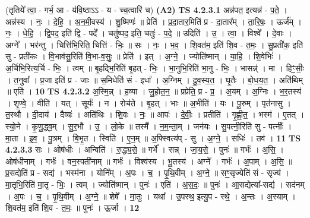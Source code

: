 \documentclass[17pt]{extarticle}
\begin{document}
                      (तृतिये᳚ त्वा॒ - गर्भ॒ आ - य॑वि॒ष्ठाऽऽ - य - च्च॒त्वारि॑ च)  \textbf{(A2)} \newline \newline
                                \textbf{ TS 4.2.3.1} \newline
                  अन्न॑पत॒ इत्यन्न॑ - प॒ते॒ । अन्न॑स्य । नः॒ । दे॒हि॒ । अ॒न॒मी॒वस्य॑ । शु॒ष्मिणः॑ ॥ प्रेति॑ । प्र॒दा॒तार॒मिति॑ प्र - दा॒तार᳚म् । ता॒रि॒षः॒ । ऊर्ज᳚म् । नः॒ । धे॒हि॒ । द्वि॒पद॒ इति॑ द्वि - पदे᳚ । चतु॑ष्पद॒ इति॒ चतुः॑ - प॒दे॒ ॥ उदिति॑ । उ॒ । त्वा॒ । विश्वे᳚ । दे॒वाः । अग्ने᳚ । भर॑न्तु । चित्ति॑भि॒रिति॒ चित्ति॑ - भिः॒ ॥ सः । नः॒ । भ॒व॒ । शि॒वत॑म॒ इति॑ शि॒व - त॒मः॒ । सु॒प्रती॑क॒ इति॑ सु - प्रती॑कः । वि॒भाव॑सु॒रिति॑ वि॒भा-व॒सुः॒ ॥ प्रेति॑ । इत् । अ॒ग्ने॒ । ज्योति॑ष्मान् । या॒हि॒ । शि॒वेभिः॑ । अ॒र्चिभि॒रित्य॒र्चि - भिः॒ । त्वम् ॥ बृ॒हद्भि॒रिति॑ बृ॒हत् - भिः॒ । भा॒नुभि॒रिति॑ भा॒नु - भिः॒ । भासन्न्॑ । मा । हिꣳ॒॒सीः॒ । त॒नुवा᳚ । प्र॒जा इति॑ प्र - जाः ॥ स॒मिधेति॑ सं - इधा᳚ । अ॒ग्निम् । दु॒व॒स्य॒त॒ । घृ॒तैः । बो॒ध॒य॒त॒ । अति॑थिम् ॥ एति॑ । \textbf{  10} \newline
                  \newline
                                \textbf{ TS 4.2.3.2} \newline
                  अ॒स्मि॒न्न् । ह॒व्या । जु॒हो॒त॒न॒ ॥ प्रप्रेति॒ प्र - प्र॒ । अ॒यम् । अ॒ग्निः । भ॒र॒तस्य॑ । शृ॒ण्वे॒ । वीति॑ । यत् । सूर्यः॑ । न । रोच॑ते । बृ॒हत् । भाः ॥ अ॒भीति॑ । यः । पू॒रुम् । पृत॑नासु । त॒स्थौ । दी॒दाय॑ । दैव्यः॑ । अति॑थिः । शि॒वः । नः॒ ॥ आपः॑ । दे॒वीः॒ । प्रतीति॑ । गृ॒ह्णी॒त॒ । भस्म॑ । ए॒तत् । स्यो॒ने । कृ॒णु॒द्ध्व॒म् । सु॒र॒भौ । उ॒ । लो॒के ॥ तस्मै᳚ । न॒म॒न्ता॒म् । जन॑यः । सु॒पत्नी॒रिति॑ सु - पत्नीः᳚ । मा॒ता । इ॒व॒ । पु॒त्रम् । बि॒भृ॒त । स्विति॑ । ए॒न॒म् ॥ अ॒फ्स्वित्य॑प् - सु । अ॒ग्ने॒ । सधिः॑ । तव॑ । \textbf{  11} \newline
                  \newline
                                \textbf{ TS 4.2.3.3} \newline
                  सः । ओष॑धीः । अन्विति॑ । रु॒द्ध्य॒से॒ ॥ गर्भे᳚ । सन्न् । जा॒य॒से॒ । पुनः॑ ॥ गर्भः॑ । अ॒सि॒ । ओष॑धीनाम् । गर्भः॑ । वन॒स्पती॑नाम् ॥ गर्भः॑ । विश्व॑स्य । भू॒तस्य॑ । अग्ने᳚ । गर्भः॑ । अ॒पाम् । अ॒सि॒ ॥ प्र॒सद्येति॑ प्र - सद्य॑ । भस्म॑ना । योनि᳚म् । अ॒पः । च॒ । पृ॒थि॒वीम् । अ॒ग्ने॒ ॥ सꣳ॒॒सृज्येति॑ सं - सृज्य॑ । मा॒तृभि॒रिति॑ मा॒तृ - भिः॒ । त्वम् । ज्योति॑ष्मान् । पुनः॑ । एति॑ । अ॒स॒दः॒ ॥ पुनः॑ । आ॒सद्येत्या᳚-सद्य॑ । सद॑नम् । अ॒पः । च॒ । पृ॒थि॒वीम् । अ॒ग्ने॒ ॥ शेषे᳚ । मा॒तुः । यथा᳚ । उ॒पस्थ॒ इत्यु॒प - स्थे॒ । अ॒न्तः । अ॒स्याम् । शि॒वत॑म॒ इति॑ शि॒व - त॒मः॒ ॥ पुनः॑ । ऊ॒र्जा । \textbf{  12} \newline
\end{document}
